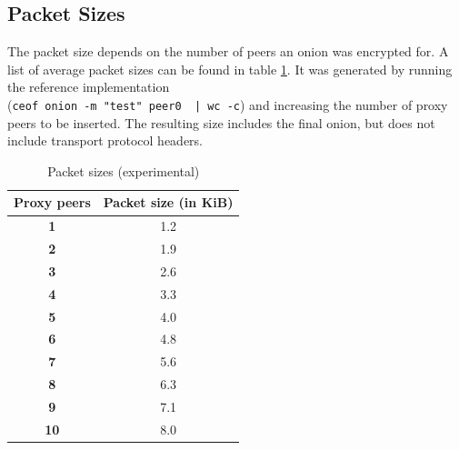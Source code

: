 \subsection{Packet Sizes}
The packet size depends on the number of peers an onion was
encrypted for. A list of average packet sizes can be found 
in table \ref{pkgsizes}.
It was generated by running the reference implementation\\
(\verb=ceof onion -m "test" peer0  | wc -c=)
and increasing the number of proxy peers to be inserted.
The resulting size includes the final onion, 
but does not include transport protocol headers.
\begin{longtable}{|c|c|}
\caption{Packet sizes (experimental)}
\label{pkgsizes}\\
\hline
\textbf{Proxy peers} & \textbf{Packet size (in KiB)}\\
\hline
\textbf{1} & 1.2\\
\hline
\textbf{2} & 1.9\\
\hline
\textbf{3} & 2.6\\
\hline
\textbf{4} & 3.3\\
\hline
\textbf{5} & 4.0\\
\hline
\textbf{6} & 4.8\\
\hline
\textbf{7} & 5.6\\
\hline
\textbf{8} & 6.3\\
\hline
\textbf{9} & 7.1\\
\hline
\textbf{10} & 8.0\\
\hline
\end{longtable}
